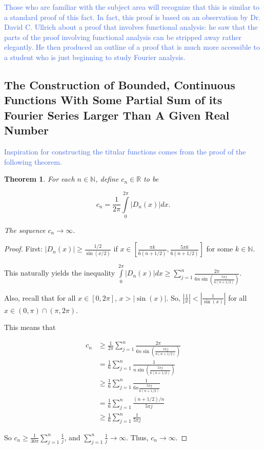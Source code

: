 \documentclass{amsart}
\newcommand{\N}{\mathbb{N}}
\newcommand{\R}{\mathbb{R}}
\newcommand{\colorcomment}[2]{\textcolor{#1}{#2}} %
\newcommand{\absval}[1]{\left| #1 \right|}
\newtheorem{thm}{Theorem}[section]
\theoremstyle{definition}
\begin{document}
\colorcomment{RoyalBlue}{Those who are familiar with the subject area will recognize that this is similar to a standard proof of this fact. 
In fact, this proof is based on an observation by Dr. David C. Ullrich about a proof that involves functional analysis: he saw that the parts of the proof involving functional analysis can be stripped away rather elegantly. He then produced an outline of a proof that is much more accessible to a student who is just beginning to study Fourier analysis.}

\subsection{The Construction of Bounded, Continuous Functions With Some Partial Sum of its Fourier Series Larger Than A Given Real Number}

\colorcomment{RoyalBlue}{Inspiration for constructing the titular functions comes from the proof of the following theorem.}

\begin{thm}
For each $n \in \N$, define $c_n \in \R$ to be

\begin{displaymath}
c_n = \frac{1}{2 \pi} \int\limits_0^{2\pi} \absval{D_n(x)} dx.
\end{displaymath}

The sequence $c_n \to \infty$.
\end{thm}

\begin{proof}

First: $\absval{D_n(x)} \geq \frac{1/2}{\sin(x/2)}$ if $x \in [\frac{\pi k}{6(n+1/2)},\frac{5 \pi k}{6(n+1/2)}]$ for some $k \in \N$.

This naturally yields the inequality $\int\limits_0^{2\pi} \absval{D_n(x)} dx \geq \sum\limits_{j=1}^n \frac{2 \pi}{6n \sin(\frac{5\pi j}{6(n+1/2)})}$. 


Also, recall that for all $x \in [0, 2\pi]$, $x > \absval{\sin(x)}$. 
So, $\absval{\frac{1}{x}} < \absval{\frac{1}{\sin(x)}}$ for all $x \in (0, \pi) \cap (\pi, 2\pi)$.

This means that 

\begin{align*}
c_n &\geq \frac{1}{2 \pi} \sum\limits_{j=1}^n \frac{2 \pi}{6n \sin(\frac{5\pi j}{6(n+1/2)})}\\
&= \frac{1}{6} \sum\limits_{j=1}^n \frac{1}{n \sin(\frac{5\pi j}{6(n+1/2)})}\\
&\geq \frac{1}{6} \sum\limits_{j=1}^n \frac{1}{6n \frac{5\pi j}{6(n+1/2)}}\\
&= \frac{1}{6} \sum\limits_{j=1}^n \frac{(n+1/2)/{n}}{5\pi j}\\
&\geq \frac{1}{6} \sum\limits_{j=1}^n \frac{1}{5\pi j}
\end{align*}

So $c_n \geq \frac{1}{30 \pi} \sum\limits_{j=1}^n \frac{1}{ j}$, and $\sum\limits_{j=1}^n \frac{1}{j} \to \infty$. 
Thus, $c_n \to \infty$.

\end{proof}
\end{document}
